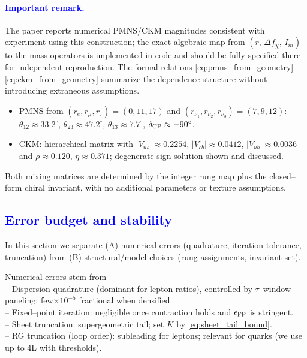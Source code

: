 \documentclass[%
 amsmath,amssymb,
 aps,
prb,
floatfix, showkeys
]{revtex4-2}
\newcommand{\modif}[1]{\textcolor{blue}{#1}}
\begin{document}
\paragraph{ \modif{ Important remark.}}
The paper reports numerical PMNS/CKM magnitudes consistent with experiment using this construction; the exact algebraic map from $(r,\,\Delta f_\chi,\,I_m)$ to the mass operators is implemented in code and should be fully specified there for independent reproduction. The formal relations \eqref{eq:pmns_from_geometry}–\eqref{eq:ckm_from_geometry} summarize the dependence structure without introducing extraneous assumptions.

\begin{itemize}
  \item PMNS from $(r_e,r_\mu,r_\tau)=(0,11,17)$ and $(r_{\nu_1},r_{\nu_2},r_{\nu_3})=(7,9,12)$:
  $\theta_{12}\approx33.2^\circ$, $\theta_{23}\approx47.2^\circ$, $\theta_{13}\approx7.7^\circ$, $\delta_{\rm CP}\approx-90^\circ$.
  \item CKM: hierarchical matrix with $|V_{us}|\approx0.2254$, $|V_{cb}|\approx0.0412$, $|V_{ub}|\approx0.0036$ and $\bar\rho\approx0.120$, $\bar\eta\approx0.371$; degenerate sign solution shown and discussed.
\end{itemize}
Both mixing matrices are determined by the integer rung map plus the closed--form chiral invariant, with no additional parameters or texture assumptions.






























{\modif{
\section{Error budget and stability}
\label{sec:error_stability}
}}
In this section we separate
(A) numerical errors (quadrature,  iteration tolerance, truncation) from
(B) structural/model choices (rung assignments, invariant set).

Numerical errors stem from \\
-- Dispersion quadrature (dominant for lepton ratios), controlled by $\tau$--window paneling;
few$\times 10^{-5}$ fractional when densified. \\
-- Fixed--point iteration: negligible once contraction holds and $\epsilon_{\rm FP}$ is stringent. \\
-- Sheet truncation: supergeometric tail; set $K$ by \eqref{eq:sheet_tail_bound}. \\
-- RG truncation (loop order): subleading for leptons; relevant for quarks (we use up to 4L with thresholds). 
\end{document}
